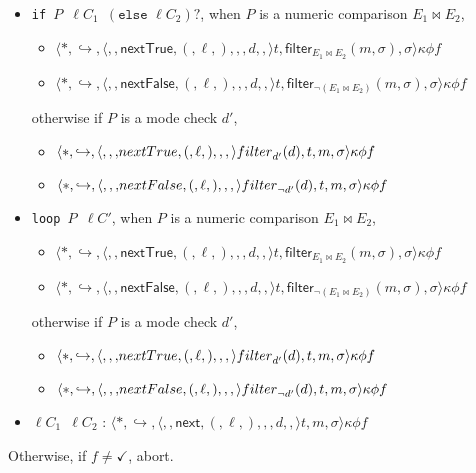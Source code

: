 \documentclass[a4paper]{article}
\newcommand*{\state}[8]{\langle #1, #2, #3, #4, #5, #6, #7, #8 \rangle}
\newcommand*{\Next}{\mathsf{next}}
\newcommand*{\NextTrue}{\mathsf{nextTrue}}
\newcommand*{\NextFalse}{\mathsf{nextFalse}}
\newcommand*{\tarrow}{\hookrightarrow}
\newcommand*{\filter}{\mathsf{filter}}
\begin{document}
\begin{itemize}
\item \texttt{if $P$ $\ell C_1$ $(\texttt{else }\ell C_2)?$}, when $P$ is a numeric comparison $E_1 \bowtie E_2$,
  \begin{itemize}
  \item $\state* \tarrow \state{\NextTrue(\ell)}{d}{t}{\filter_{E_1 \bowtie E_2}(m, \sigma)}{\sigma}{\kappa}{\phi}{f}$
  \item $\state* \tarrow \state{\NextFalse(\ell)}{d}{t}{\filter_{\neg (E_1 \bowtie E_2)}(m, \sigma)}{\sigma}{\kappa}{\phi}{f}$
  \end{itemize}
  otherwise if $P$ is a mode check $d'$,
  \begin{itemize}
  \item $\state* \tarrow \state{\NextTrue(\ell)}{\filter_{d'}(d)}{t}{m}{\sigma}{\kappa}{\phi}{f}$
  \item $\state* \tarrow \state{\NextFalse(\ell)}{\filter_{\neg d'}(d)}{t}{m}{\sigma}{\kappa}{\phi}{f}$
  \end{itemize}
\item \texttt{loop $P$ $\ell C'$}, when $P$ is a numeric comparison $E_1 \bowtie E_2$,
  \begin{itemize}
  \item $\state* \tarrow \state{\NextTrue(\ell)}{d}{t}{\filter_{E_1 \bowtie E_2}(m, \sigma)}{\sigma}{\kappa}{\phi}{f}$
  \item $\state* \tarrow \state{\NextFalse(\ell)}{d}{t}{\filter_{\neg (E_1 \bowtie E_2)}(m, \sigma)}{\sigma}{\kappa}{\phi}{f}$
  \end{itemize}
  otherwise if $P$ is a mode check $d'$,
  \begin{itemize}
  \item $\state* \tarrow \state{\NextTrue(\ell)}{\filter_{d'}(d)}{t}{m}{\sigma}{\kappa}{\phi}{f}$
  \item $\state* \tarrow \state{\NextFalse(\ell)}{\filter_{\neg d'}(d)}{t}{m}{\sigma}{\kappa}{\phi}{f}$
  \end{itemize}
\item \texttt{$ \ell C_1$ $\ell C_2$} : $\state* \tarrow \state{\Next(\ell)}{d}{t}{m}{\sigma}{\kappa}{\phi}{f}$
\end{itemize}
Otherwise, if $f \ne \checkmark$, abort.
\end{document}
